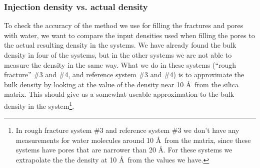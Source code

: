 \subsubsection*{Injection density vs. actual density}
To check the accuracy of the method we use for filling the fractures and pores with water, we want to compare the input densities used when filling the pores to the actual resulting density in the systems. We have already found the bulk density in four of the systems, but in the other systems we are not able to measure the density in the same way. What we do in these systems (``rough fracture'' \#3 and \#4, and reference system \#3 and \#4) is to approximate the bulk density by looking at the value of the density near 10 \AA\ from the silica matrix. This should give us a somewhat useable approximation to the bulk density in the system\footnote{In rough fracture system \#3 and reference system \#3 we don't have any measurements for water molecules around 10 \AA\ from the matrix, since these systems have pores that are narrower than 20 \AA. For these systems we extrapolate the the density at 10 \AA\ from the values we have.}.

